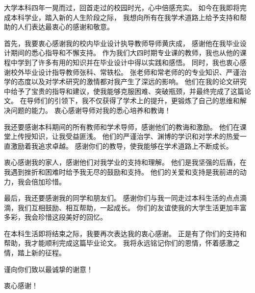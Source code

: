\begin{acknowledgements}

大学本科四年一晃而过，回首走过的校园时光，心中倍感充实。
如今在我即将完成本科学业，踏入新的人生阶段之际，
我想向所有在我学术道路上给予支持和帮助的人们表达最衷心的感谢和敬意。

首先，我要衷心感谢我的校内毕业设计执导教师导师黄庆成，
感谢他在我毕业设计期间的悉心指导和不懈支持。
作为我们大四时期专业课的教师，我也从他的课程中学到了许多有用的知识并在毕业设计中得以实践和感悟。
同时，我也衷心感谢校外毕业设计指导教师张科、常轶松。
张老师和常老师的的专业知识、严谨治学的态度以及对学术研究的激情都对我产生了深远的影响。
他们在我的论文研究中给予了宝贵的指导和建议，使我能够克服困难、突破瓶颈，并最终完成了这篇论文。
在导师们的引领下，我不仅获得了学术上的提升，更锻炼了自己的思维和解决问题的能力。
衷心感谢导师对我的悉心培养和教诲！

我还要感谢本科期间的所有教师和学术导师，感谢他们的教诲和激励。
他们在课堂上传授知识，让我受益匪浅。
他们的严谨治学、渊博的学识和对学术的热爱一直激励着我追求卓越。
感谢你们的教导，使我能够在学术道路上不断成长。

衷心感谢我的家人，感谢他们对我学业的支持和理解。
他们是我坚强的后盾，在我遇到挫折和困难时给予我无尽的鼓励和支持。
他们的关爱和支持是我前进的动力，我会倍加珍惜。

最后，我还要感谢我的同学和朋友们。
感谢你们与我一同走过本科生活的点点滴滴，我们互相鼓励、相互帮助，一起成长。
你们的友谊使我的大学生活更加丰富多彩，我会珍惜这段美好的回忆。

在本科生活即将结束之际，我要再次表达我的衷心感谢。
正是有了你们的支持和帮助，我才能顺利完成这篇毕业论文。
我将永远铭记你们的恩情，怀着感激之情，踏上新的征程。

谨向你们致以最诚挚的谢意！

衷心感谢！

\end{acknowledgements}
